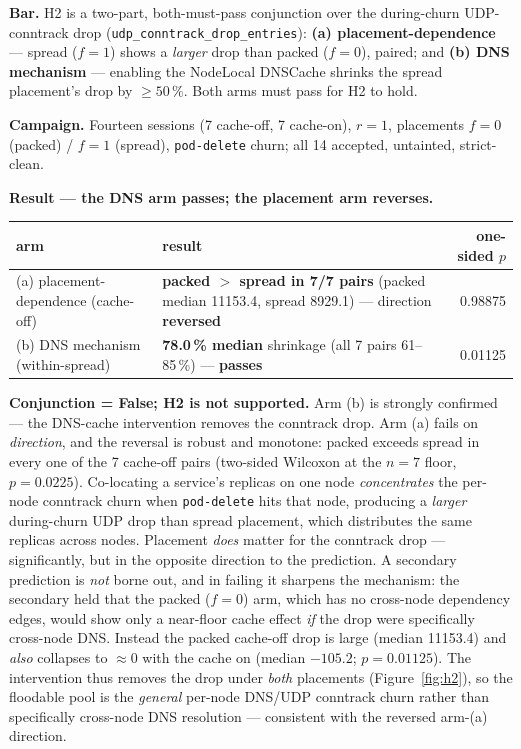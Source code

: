 \textbf{Bar.} H2 is a two-part, both-must-pass conjunction over the
during-churn UDP-conntrack drop (\texttt{udp\_conntrack\_drop\_entries}):
\textbf{(a) placement-dependence} --- spread ($f{=}1$) shows a \emph{larger}
drop than packed ($f{=}0$), paired; and \textbf{(b) DNS mechanism} --- enabling
the NodeLocal DNSCache shrinks the spread placement's drop by $\geq 50\,\%$.
Both arms must pass for H2 to hold.

\textbf{Campaign.} Fourteen sessions (7 cache-off, 7 cache-on), $r=1$, placements
$f{=}0$ (packed) / $f{=}1$ (spread), \texttt{pod-delete} churn; all 14 accepted,
untainted, strict-clean.

\textbf{Result --- the DNS arm passes; the placement arm reverses.}

\begin{center}
\begin{tabular}{p{}p{}r}
\toprule
arm & result & one-sided $p$ \\
\midrule
(a) placement-dependence (cache-off) & \textbf{packed $>$ spread in 7/7 pairs} (packed median 11153.4, spread 8929.1) --- direction \textbf{reversed} & 0.98875 \\
(b) DNS mechanism (within-spread) & \textbf{78.0\,\% median} shrinkage (all 7 pairs 61--85\,\%) --- \textbf{passes} & 0.01125 \\
\bottomrule
\end{tabular}
\end{center}

\textbf{Conjunction = False; H2 is not supported.} Arm (b) is strongly
confirmed --- the DNS-cache intervention removes the conntrack drop. Arm (a)
fails on \emph{direction}, and the reversal is robust and monotone: packed
exceeds spread in every one of the 7 cache-off pairs (two-sided Wilcoxon at the
$n=7$ floor, $p = 0.0225$). Co-locating a service's replicas on one node
\emph{concentrates} the per-node conntrack churn when \texttt{pod-delete} hits
that node, producing a \emph{larger} during-churn UDP drop than spread
placement, which distributes the same replicas across nodes. Placement
\emph{does} matter for the conntrack drop --- significantly, but in the opposite
direction to the prediction. A secondary prediction is
\emph{not} borne out, and in failing it sharpens the mechanism: the secondary
held that the packed ($f{=}0$) arm, which has no cross-node dependency edges,
would show only a near-floor cache effect \emph{if} the drop were specifically
cross-node DNS. Instead the packed cache-off drop is large (median 11153.4) and
\emph{also} collapses to $\approx 0$ with the cache on (median $-105.2$;
$p = 0.01125$). The intervention thus removes the drop under \emph{both}
placements (Figure~\ref{fig:h2}), so the floodable pool is the \emph{general}
per-node DNS/UDP conntrack churn rather than specifically cross-node DNS
resolution --- consistent with the reversed arm-(a) direction.

